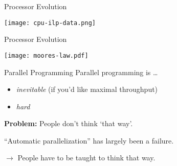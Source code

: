 \documentclass[english,compress]{beamer}
\begin{document}
\begin{frame}{Processor Evolution}
  \begin{center}
    \texttt{[image: cpu-ilp-data.png]}
  \end{center}
\end{frame}
\begin{frame}{Processor Evolution}
  \begin{center}
    \texttt{[image: moores-law.pdf]}
  \end{center}
\end{frame}
\begin{frame}{Parallel Programming}
  Parallel programming is \dots
  \begin{itemize}
    \item \emph{inevitable} (if you'd like maximal throughput)
    \item \emph{hard}
  \end{itemize}

  \bigskip
  \textbf{Problem:} People don't think `that way'.

  \bigskip
  ``Automatic parallelization'' has largely been a failure.

  \bigskip
  $\rightarrow$ People have to be taught to think that way.
  \hfill {}
\end{frame}
\end{document}
